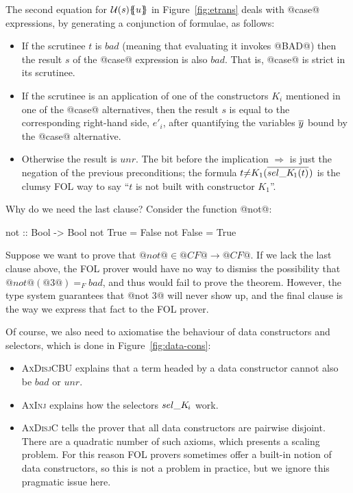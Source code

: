 The second equation for $\utrans{}{u}{s}$ in Figure~\ref{fig:etrans} deals with
@case@ expressions, by generating a conjunction of formulae, as follows:
\begin{itemize}
\item If the scrutinee $t$ is $bad$ (meaning that evaluating it invokes @BAD@) then
the result $s$ of the @case@ expression is also $bad$.  That is, @case@ is strict in
its scrutinee.
\item If the scrutinee is an application of one of the constructors $K_i$ mentioned
in one of the @case@ alternatives, then the result $s$ is equal to the corresponding
right-hand side, $e'_i$, after quantifying the variables $\ol{y}$ bound by the @case@ alternative.
\item Otherwise the result is $unr$.
The bit before the implication $\Rightarrow$ is just the
negation of the previous preconditions; the formula
  $t{\neq}K_1(\oln{{\sel{K}{1}}(t)}{})$
is the clumsy FOL way to say ``$t$ is not built with constructor $K_1$''.
\end{itemize}
Why do we need the last clause? Consider the function @not@:
\begin{code}
  not :: Bool -> Bool
  not True = False
  not False = True
\end{code}
Suppose we want to prove that $@not@ \in @CF@ \rightarrow @CF@$.
If we lack the last clause above, the FOL prover would have
no way to dismiss the possibility that $@not@(@3@) =_F bad$, and thus
would fail to prove the theorem.  However, the type system guarantees
that @not 3@ will never show up, and the final clause is the way we express that
fact to the FOL prover.

Of course, we also need to axiomatise the behaviour of data constructors and
selectors, which is done in Figure~\ref{fig:data-cons}:
\begin{itemize}
\item \textsc{AxDisjCBU} explains that a term headed by a data constructor cannot
also be $bad$ or $unr$.
\item \textsc{AxInj} explains how the selectors $\sel{K}{i}$ work.
\item \textsc{AxDisjC} tells the prover that all data constructors are pairwise disjoint.
There are a quadratic number of such axioms, which presents a scaling problem.
For this reason FOL provers sometimes offer a built-in notion of data constructors,
so this is not a problem in practice, but we ignore this pragmatic issue here.
\end{itemize}

